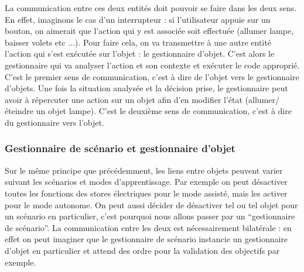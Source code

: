 La communication entre ces deux entités doit pouvoir se faire dans les deux sens.
En effet, imaginons le cas d'un interrupteur : si l'utilisateur appuie sur un bouton, on aimerait que l'action qui y est associée soit effectuée (allumer lampe, baisser volets etc ...).
Pour faire cela, on va transmettre à une autre entité l'action qui s'est exécutée sur l'objet : le gestionnaire d'objet.
C'est alors le gestionnaire qui va analyser l'action et son contexte et exécuter le code approprié. C'est le premier sens de communication, c'est à dire de l'objet vers le gestionnaire d'objets.
Une fois la situation analysée et la décision prise, le gestionnaire peut avoir à répercuter une action sur un objet afin d'en modifier l'état (allumer/éteindre un objet lampe).
C'est le deuxième sens de communication, c'est à dire du gestionnaire vers l'objet.

\subsubsection{Gestionnaire de scénario et gestionnaire d'objet}

Sur le même principe que précédemment, les liens entre objets peuvent varier suivant les scénarios et modes d'apprentissage.
Par exemple on peut désactiver toutes les fonctions des stores électriques pour le mode assisté, mais les activer pour le mode autonome.
On peut aussi décider de désactiver tel ou tel objet pour un scénario en particulier, c'est pourquoi nous allons passer par un \enquote{gestionnaire de scénario}.
La communication entre les deux est nécessairement bilatérale : en effet on peut imaginer que le gestionnaire de scénario instancie un gestionnaire d'objet en particulier et attend des ordre pour la validation des objectifs par exemple.


